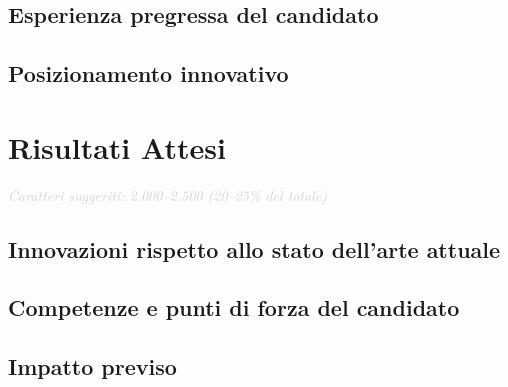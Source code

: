\documentclass[a4paper,12pt]{article}
\begin{document}
\subsection{Esperienza pregressa del candidato}

\subsection{Posizionamento innovativo}
\section{Risultati Attesi}
{\small\textcolor{lightgray}{\textit{Caratteri suggeriti: 2.000--2.500 (20--25\% del totale)}}}\\

\subsection{Innovazioni rispetto allo stato dell'arte attuale}

\subsection{Competenze e punti di forza del candidato}

\subsection{Impatto previso}
\end{document}
